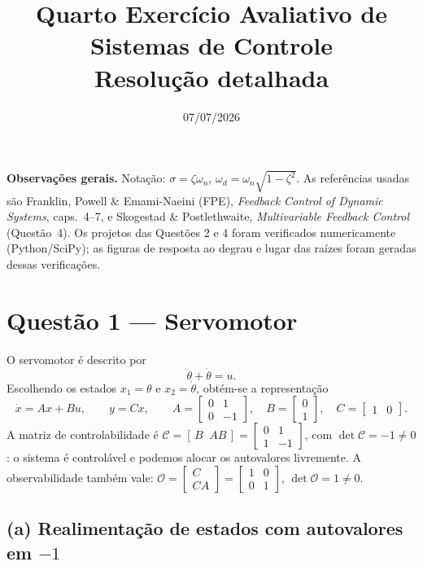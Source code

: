 \documentclass[11pt,a4paper]{article}
\title{\textbf{Quarto Exerc\'icio Avaliativo de Sistemas de Controle}\\[2mm]
\large Resolu\c{c}\~ao detalhada}
\author{}
\date{07/07/2026}
\begin{document}
\maketitle

\noindent\textbf{Observa\c{c}\~oes gerais.} Nota\c{c}\~ao: $\sigma=\zeta\omega_n$,
$\omega_d=\omega_n\sqrt{1-\zeta^2}$. As refer\^encias usadas s\~ao
Franklin, Powell \& Emami-Naeini (FPE), \emph{Feedback Control of Dynamic Systems},
caps.~4--7, e Skogestad \& Postlethwaite, \emph{Multivariable Feedback Control} (Quest\~ao~4).
Os projetos das Quest\~oes 2 e 4 foram verificados numericamente (Python/SciPy);
as figuras de resposta ao degrau e lugar das ra\'izes foram geradas dessas verifica\c{c}\~oes.

\section*{Quest\~ao 1 --- Servomotor}

O servomotor \'e descrito por
\[
\ddot{\theta}+\dot{\theta}=u .
\]
Escolhendo os estados $x_1=\theta$ e $x_2=\dot{\theta}$, obt\'em-se a representa\c{c}\~ao
\[
\dot{x}=Ax+Bu,\qquad y=Cx,\qquad
A=\begin{bmatrix}0&1\\0&-1\end{bmatrix},\quad
B=\begin{bmatrix}0\\1\end{bmatrix},\quad
C=\begin{bmatrix}1&0\end{bmatrix}.
\]
A matriz de controlabilidade \'e
$\mathcal{C}=[\,B\;\;AB\,]=\begin{bmatrix}0&1\\1&-1\end{bmatrix}$, com
$\det\mathcal{C}=-1\neq0$: o sistema \'e control\'avel e podemos alocar os autovalores
livremente. A observabilidade tamb\'em vale:
$\mathcal{O}=\begin{bmatrix}C\\CA\end{bmatrix}=\begin{bmatrix}1&0\\0&1\end{bmatrix}$,
$\det\mathcal{O}=1\neq0$.

\subsection*{(a) Realimenta\c{c}\~ao de estados com autovalores em $-1$}
\end{document}
